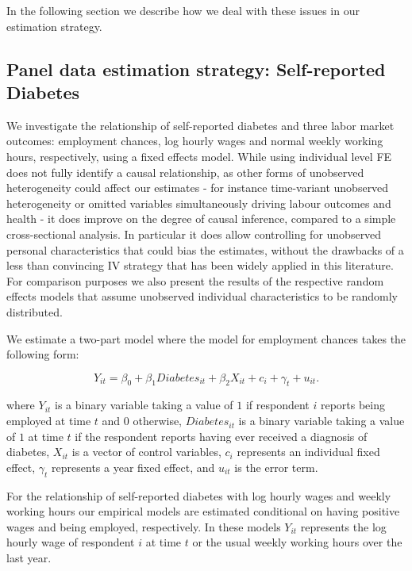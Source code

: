 \documentclass[12pt,english,british]{article}
\begin{document}
In the following section we describe how we deal with these issues in our estimation strategy.


\subsection{Panel data estimation strategy: Self-reported Diabetes}

We investigate the relationship of self-reported diabetes and three
labor market outcomes: employment chances, log hourly wages
and normal weekly working hours, respectively, using a fixed effects model. While using individual level \ac{FE} does not fully
identify a causal relationship, as other forms of unobserved heterogeneity could
affect our estimates - for instance time-variant unobserved heterogeneity
or omitted variables simultaneously driving labour outcomes and health -  it does improve on the degree of causal inference,
compared to a simple cross-sectional analysis. In particular it
does allow controlling for unobserved personal characteristics that
could bias the estimates, without the drawbacks of a less than convincing
\ac{IV} strategy that has been widely applied in this literature. 
For comparison purposes we also present the results of the respective random effects models that assume unobserved individual characteristics to be randomly distributed.


We estimate a two-part model where the model for employment chances
takes the following form:

\noindent 
\begin{equation}
Y_{it}=\beta_{0}+\beta_{1}Diabetes_{it}+\beta_{2}X_{it}+c_{i}+\gamma_{t}+u_{it}.\label{eq:employed}
\end{equation}


where $Y_{it}$ is a binary variable taking a value of $1$ if respondent
$i$ reports being employed at time $t$ and $0$ otherwise, $Diabetes_{it}$
is a binary variable taking a value of $1$ at time $t$ if the respondent
reports having ever received a diagnosis of diabetes, $X_{it}$ is
a vector of control variables, $c_{i}$ represents an individual fixed
effect, $\gamma_{t}$ represents a year fixed effect, and $u_{it}$
is the error term.

For the relationship of self-reported diabetes with log hourly wages
and weekly working hours our empirical models are estimated conditional on having positive wages and being
employed, respectively. In these models $Y_{it}$ represents the log hourly wage
of respondent $i$ at time $t$ or the usual weekly working hours
over the last year.
\end{document}
